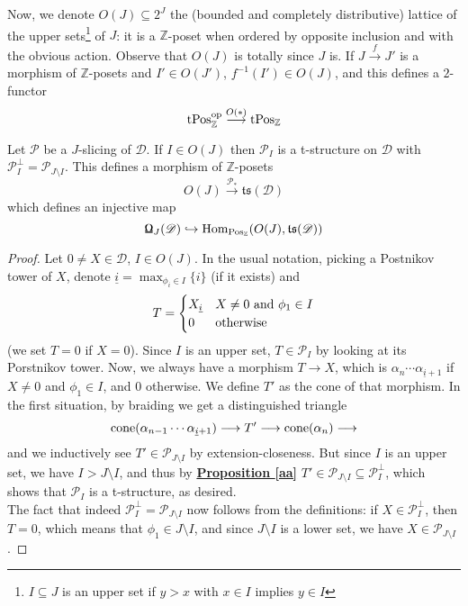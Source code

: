 Now, we denote $O(J) \subseteq 2^J$ the (bounded and completely distributive) lattice of the upper sets\footnote{$I \subseteq J$ is an upper set if $y > x$ with $x \in I$ implies $y \in I$} of $J$: it is a $\mathbb{Z}$-poset when ordered by opposite inclusion and with the obvious action. Observe that $O(J)$ is totally since $J$ is. If $J \overset{f}{\longrightarrow} J'$ is a morphism of $\mathbb{Z}$-posets and $I' \in O(J')$, $f^{-1}(I') \in O(J)$, and this defines a $2$-functor $$\textnormal{tPos}_{\mathbb{Z}}^{\textnormal{op}} \overset{O(*)}{\longrightarrow} \textnormal{tPos}_{\mathbb{Z}}$$

\begin{prop}\label{u}
Let $\mathscr{P}$ be a $J$-slicing of $\mathscr{D}$. If $I \in O(J)$ then $\mathscr{P}_I$ is a t-structure on $\mathscr{D}$ with $\mathscr{P}_I^{\perp}=\mathscr{P}_{J \setminus I}$. This defines a morphism of $\mathbb{Z}$-posets $$O(J) \overset{\mathscr{P}_*}{\longrightarrow} \mathfrak{ts}(\mathscr{D})$$
which defines an injective map $$\textnormal{\Libra}_J(\mathscr{D}) \hookrightarrow \textnormal{Hom}_{\textnormal{Pos}_{\mathbb{Z}}}(O(J),\mathfrak{ts}(\mathscr{D}))$$ 
\end{prop}

\begin{proof}
Let $0 \not = X \in \mathscr{D}$, $I \in O(J)$. In the usual notation, picking a Postnikov tower of $X$, denote $\underline{i}=\max_{\phi_i \in I}\{ i \}$ (if it exists) and $$T= \begin{cases} X_{\underline{i}} & X \not = 0 \ \textnormal{and} \ \phi_1  \in I \\ 0 & \textnormal{otherwise} \end{cases}$$
(we set $T=0$ if $X=0$). Since $I$ is an upper set, $T \in \mathscr{P}_{I}$ by looking at its Porstnikov tower. Now, we always have a morphism $T \longrightarrow X$, which is $\alpha_n \cdots \alpha_{\underline{i}+1}$ if $X \not = 0 $ and $\phi_1  \in I$, and $0$ otherwise. We define $T'$ as the cone of that morphism. In the first situation, by braiding we get a distinguished triangle $$\textnormal{cone}( \alpha_{n-1} \cdots \alpha_{\underline{i}+1}) \longrightarrow T' \longrightarrow \textnormal{cone}(\alpha_n) \longrightarrow $$
and we inductively see $T' \in \mathscr{P}_{J \setminus I}$ by extension-closeness. But since $I$ is an upper set, we have $I > J \setminus I$, and thus by \hyperref[aa]{\textbf{Proposition \ref*{aa}}} $T' \in \mathscr{P}_{J \setminus I} \subseteq \mathscr{P}_I^{\perp}$, which shows that $\mathscr{P}_I$ is a t-structure, as desired. \\
The fact that indeed $\mathscr{P}_I^{\perp}=\mathscr{P}_{J \setminus I}$ now follows from the definitions: if $X \in \mathscr{P}_I^{\perp}$, then $T=0$, which means that $\phi_1 \in J \setminus I$, and since $J \setminus I$ is a lower set, we have $X \in \mathscr{P}_{J \setminus I}$. 
\end{proof}

